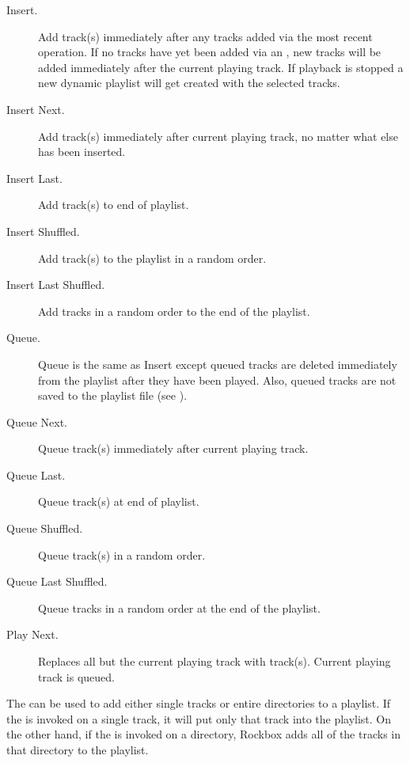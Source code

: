 \begin{description} 
\item [Insert.] Add track(s) immediately after any tracks added via the most
  recent  operation. If no tracks have yet been added via an
  , new tracks will be added immediately after the current
  playing track. If playback is stopped a new dynamic playlist will get
  created with the selected tracks.
  
\item [Insert Next.] Add track(s) immediately after current playing
  track, no matter what else has been inserted.
  
\item [Insert Last.] Add track(s) to end of playlist.

\item [Insert Shuffled.] Add track(s) to the playlist in a random order.

\item [Insert Last Shuffled.] Add tracks in a random order to the end of the playlist.

\item [Queue.] Queue is the same as Insert except queued tracks are
  deleted immediately from the playlist after they have been played. Also,
  queued tracks are not saved to the playlist file (see
  ).
  
\item [Queue Next.] Queue track(s) immediately after current playing track.
  
\item [Queue Last.] Queue track(s) at end of playlist.

\item [Queue Shuffled.] Queue track(s) in a random order.

\item [Queue Last Shuffled.] Queue tracks in a random order at the end of the playlist.

\item [Play Next.] Replaces all but the current playing track with track(s).
    Current playing track is queued.
\end{description}

The   can be used to add either single tracks or
entire directories to a playlist. If the  is
invoked on a single track, it will put only that track into the playlist.
On the other hand, if the  is invoked on a
directory, Rockbox adds all of the tracks in that directory to the
playlist.\\

